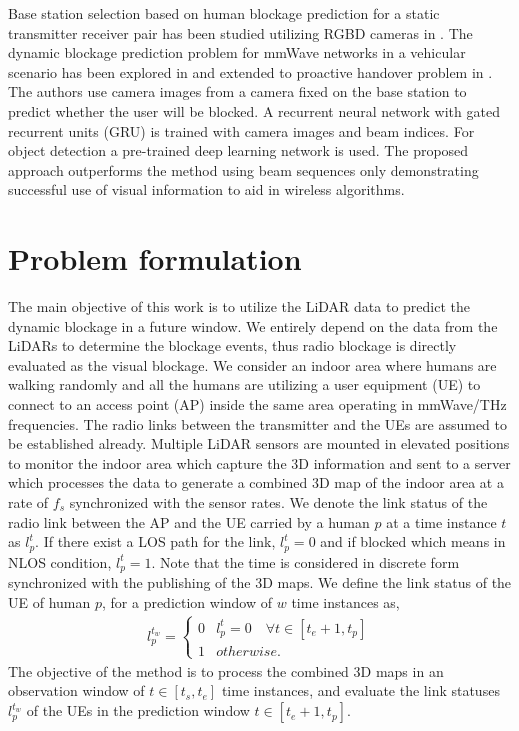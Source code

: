 \documentclass[conference]{IEEEtran}
\begin{document}
Base station selection based on human blockage prediction for a static transmitter receiver pair has been studied utilizing RGBD cameras in \cite{proactivebasestation}. The dynamic blockage prediction problem for mmWave networks in a vehicular scenario has been explored in \cite{charan2020visionaided} and extended to proactive handover problem in \cite{charan2021visionaided}. The authors use camera images from a camera fixed on the base station to predict whether the user will be blocked. A recurrent neural network with gated recurrent units (GRU) is trained with camera images and beam indices. For object detection a pre-trained deep learning network is used. The proposed approach outperforms the method using beam sequences only demonstrating successful use of visual information to aid in wireless algorithms. 

\section{Problem formulation }

The main objective of this work is to utilize the LiDAR data to predict the dynamic blockage in a future window. We entirely depend on the data from the LiDARs to determine the blockage events, thus radio blockage is directly evaluated as the visual blockage. We consider an indoor area where humans are walking randomly and all the humans are utilizing a user equipment (UE) to connect to an access point (AP) inside the same area operating in mmWave/THz frequencies. The radio links between the transmitter and the UEs are assumed to be established already. Multiple LiDAR sensors are mounted in elevated positions to monitor the indoor area which capture the 3D information and sent to a server which processes the data to generate a combined 3D map of the indoor area at a rate of $f_s$ synchronized with the sensor rates. We denote the link status of the radio link between the AP and the UE carried by a human $p$ at a time instance $t$ as $l_p^{t}$. If there exist a LOS path for the link, $l_p^{t} = 0$ and if blocked which means in NLOS condition, $l_p^{t} = 1$. Note that the time is considered in discrete form synchronized with the publishing of the 3D maps. We define the link status of the UE of human $p$, for a prediction window of $w$ time instances as,
\begin{gather*}
l_p^{t_w} =
\begin{cases}
   0 &  l_p^{t} = 0 \quad  \forall t \in [{t_{e} + 1}, t_{p}]   \\    
   1 & otherwise. 
\end{cases}
\end{gather*}
The objective of the method is to  process the combined 3D maps in an observation window of $t \in [{t_{s}}, t_{e}]$ time instances, and evaluate the link statuses $l_p^{t_w}$ of the UEs in the prediction window $t \in [{t_{e} + 1}, t_{p}]$.  
\end{document}
